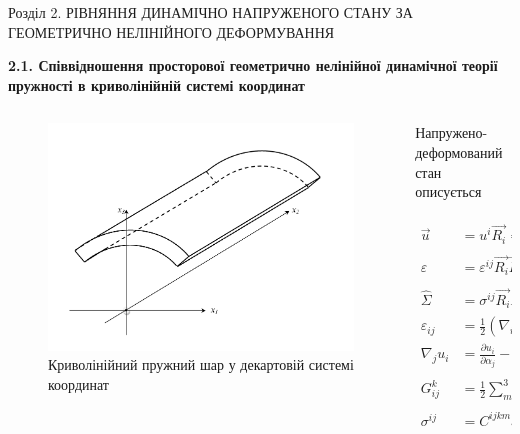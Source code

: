 \documentclass[8pt]{beamer}
\numberwithin{figure}{section}
\numberwithin{equation}{section}
\begin{document}
\begin{frame}{Розділ 2. РІВНЯННЯ ДИНАМІЧНО НАПРУЖЕНОГО СТАНУ ЗА ГЕОМЕТРИЧНО НЕЛІНІЙНОГО ДЕФОРМУВАННЯ}

\textbf{2.1. Співвідношення просторової геометрично нелінійної динамічної теорії пружності в криволінійній системі координат
}

\begin{columns}
	\begin{column}{0.35\linewidth}
		\begin{figure}
			\includegraphics[scale=0.15]{pic/layer.png}
			\caption{Криволінійний пружний шар у декартовій системі координат}
			\label{fig:21}
		\end{figure}
	\end{column}
	\begin{column}{0.65\textwidth}
    	\begin{center}
	    	Напружено-деформований стан описується
    	\end{center}
\begin{align}
\vec{u} &= u^i \vec{R_i}=u_i \vec{R^i}\\
\hat{\varepsilon} &= \varepsilon^{ij} \vec{R_i}\vec{R_j}=\varepsilon_{ij} \vec{R^i}\vec{R^j}\\
\hat{\Sigma} &= \sigma^{ij} \vec{R_i}\vec{R_j}=\sigma_{ij} \vec{R^i}\vec{R^j}\\
\varepsilon_{ij} &= \frac{1}{2} \left( \nabla_i u_j + \nabla_j u_i + \nabla_i u^j \nabla_j u_k \right)\\
\nabla_j u_i &= \frac{ \partial u_i }{ \partial \alpha_j } - u_k G ^k _{ij}\\
G ^k _{ij} &= \frac12 \sum_{m=1}^{3} g^{km} 
\left(
\frac{\partial g_{im}}{\partial \alpha_j} + \frac{\partial g_{jm}}{\partial \alpha_i} - \frac{\partial g_{ij}}{\partial \alpha_m} 
\right) \\
\sigma^{ij} &= C^{ijkm}\varepsilon^{km}
\end{align}
	\end{column}
\end{columns}


\end{frame}
\end{document}
